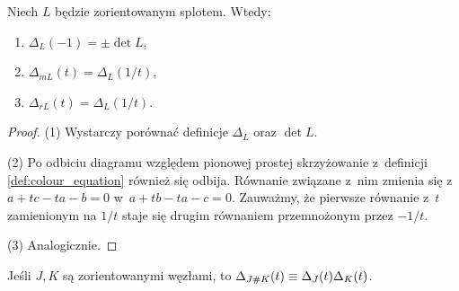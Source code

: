 \begin{proposition}
	Niech $L$ będzie zorientowanym splotem.
	Wtedy:
	\begin{enumerate}
		\item $\Delta_L(-1) = \pm \det L$,
		\item $\Delta_{mL}(t) = \Delta_L(1/t)$,
		\item $\Delta_{rL}(t) = \Delta_L(1/t)$.
	\end{enumerate}
\end{proposition}

\begin{proof}
	(1) Wystarczy porównać definicje $\Delta_L$ oraz $\det L$.

	(2) Po odbiciu diagramu względem pionowej prostej skrzyżowanie z~definicji \ref{def:colour_equation} również się odbija.
	Równanie związane z~nim zmienia się z~$a + tc - ta - b = 0$ w~$a + tb - ta - c = 0$.
	Zauważmy, że pierwsze równanie z~$t$ zamienionym na $1/t$ staje się drugim równaniem przemnożonym przez $-1/t$.

	(3) Analogicznie.
\end{proof}

\begin{proposition}
	Jeśli $J, K$ są zorientowanymi węzłami, to $\Delta_{J \mathbin{\#} K}(t) \equiv \Delta_J(t) \Delta_K(t)$.
\end{proposition}

